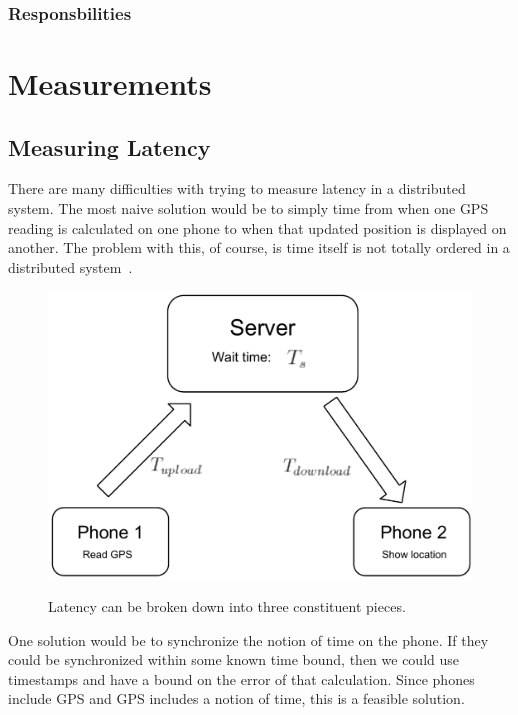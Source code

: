 \documentclass{acm_proc_article-sp}
\begin{document}
\subsubsection{Responsbilities}


\section{Measurements}
\subsection{Measuring Latency}\label{measuring}

There are many difficulties with trying to measure latency in a
distributed system.  The most naive solution would be to simply time
from when one GPS reading is calculated on one phone to when that
updated position is displayed on another. The problem with this, of
course, is time itself is not totally ordered in a distributed
system~\cite{Lamport:1978:TCO}.

\begin{figure}
\centering
\includegraphics[scale=0.4]{figs/LatencyExplanation}
\label{fig:LatencyExplanation}
\caption{Latency can be broken down into three constituent pieces.}
\end{figure}

One solution would be to synchronize the notion of time on the phone.
If they could be synchronized within some known time bound, then we
could use timestamps and have a bound on the error of that
calculation.  Since phones include GPS and GPS includes a notion of
time, this is a feasible solution.
\end{document}
